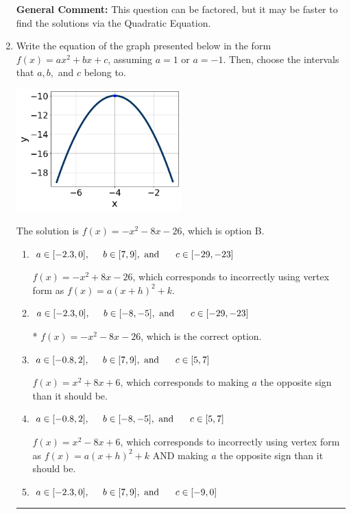 \documentclass{extbook}[14pt]
\newcommand{\litem}[1]{\item #1

\rule{\textwidth}{0.4pt}}
\begin{document}
\begin{enumerate}
{\textbf{General Comment:} This question can be factored, but it may be faster to find the solutions via the Quadratic Equation.
}
\litem{
Write the equation of the graph presented below in the form $f(x)=ax^2+bx+c$, assuming  $a=1$ or $a=-1$. Then, choose the intervals that $a, b,$ and $c$ belong to.

\begin{center}
    \includegraphics[width=0.5\textwidth]{../Figures/quadraticGraphToEquationCopyC.png}
\end{center}


The solution is \( f(x) = -x^{2} -8 x -26 \), which is option B.\begin{enumerate}[label=\Alph*.]
\item \( a \in [-2.3, 0], \hspace*{5mm} b \in [7, 9], \text{ and } \hspace*{5mm} c \in [-29, -23] \)

$f(x)=-x^{2} +8 x -26$, which corresponds to incorrectly using vertex form as $f(x) = a(x+h)^2+k$.
\item \( a \in [-2.3, 0], \hspace*{5mm} b \in [-8, -5], \text{ and } \hspace*{5mm} c \in [-29, -23] \)

* $f(x)=-x^{2} -8 x -26$, which is the correct option.
\item \( a \in [-0.8, 2], \hspace*{5mm} b \in [7, 9], \text{ and } \hspace*{5mm} c \in [5, 7] \)

$f(x)=x^{2} +8 x + 6$, which corresponds to making $a$ the opposite sign than it should be.
\item \( a \in [-0.8, 2], \hspace*{5mm} b \in [-8, -5], \text{ and } \hspace*{5mm} c \in [5, 7] \)

$f(x)=x^{2} -8 x + 6$, which corresponds to incorrectly using vertex form as $f(x) = a(x+h)^2+k$ AND making $a$ the opposite sign than it should be.
\item \( a \in [-2.3, 0], \hspace*{5mm} b \in [7, 9], \text{ and } \hspace*{5mm} c \in [-9, 0] \)


\end{enumerate}}
\end{enumerate}
\end{document}
